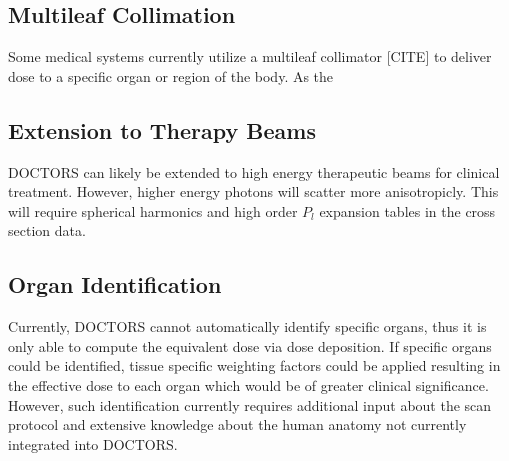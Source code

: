 \subsection{Multileaf Collimation}
Some medical systems currently utilize a multileaf collimator [CITE] to deliver dose to a specific organ or region of the body. As the 

\subsection{Extension to Therapy Beams}
DOCTORS can likely be extended to high energy therapeutic beams for clinical treatment. However, higher energy photons will scatter more anisotropicly. This will require spherical harmonics and high order $P_l$ expansion tables in the cross section data.

\subsection{Organ Identification}
Currently, DOCTORS cannot automatically identify specific organs, thus it is only able to compute the equivalent dose via dose deposition. If specific organs could be identified, tissue specific weighting factors could be applied resulting in the effective dose to each organ which would be of greater clinical significance. However, such identification currently requires additional input about the scan protocol and extensive knowledge about the human anatomy not currently integrated into DOCTORS.

\endinput
